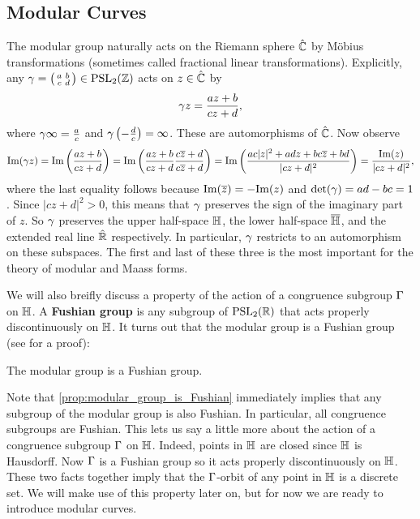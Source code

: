     \subsection*{Modular Curves}
      The modular group naturally acts on the Riemann sphere $\hat{\mathbb{C}}$ by M\"obius transformations (sometimes called fractional linear transformations). Explicitly, any $\gamma = \begin{psmallmatrix} a & b \\ c & d \end{psmallmatrix} \in \mathrm{PSL}_{2}(\mathbb{Z})$ acts on $z \in \hat{\mathbb{C}}$ by
      \[
        \gamma z = \frac{az+b}{cz+d},
      \]
      where $\gamma \infty = \frac{a}{c}$ and $\gamma\left(-\frac{d}{c}\right) = \infty$. These are automorphisms of $\hat{\mathbb{C}}$. Now observe
      \[
        \mathrm{Im}(\gamma z) = \mathrm{Im}\left(\frac{az+b}{cz+d}\right) = \mathrm{Im}\left(\frac{az+b}{cz+d}\frac{c\overline{z}+d}{c\overline{z}+d}\right) = \mathrm{Im}\left(\frac{ac|z|^{2}+adz+bc\overline{z}+bd}{|cz+d|^{2}}\right) = \frac{\mathrm{Im}(z)}{|cz+d|^{2}},
      \]
      where the last equality follows because $\mathrm{Im}(\overline{z}) = -\mathrm{Im}(z)$ and $\det(\gamma) = ad-bc = 1$. Since $|cz+d|^{2} > 0$, this means that $\gamma$ preserves the sign of the imaginary part of $z$. So $\gamma$ preserves the upper half-space $\mathbb{H}$, the lower half-space $\overline{\mathbb{H}}$, and the extended real line $\hat{\mathbb{R}}$ respectively. In particular, $\gamma$ restricts to an automorphism on these subspaces. The first and last of these three is the most important for the theory of modular and Maass forms.

      We will also breifly discuss a property of the action of a congruence subgroup $\Gamma$ on $\mathbb{H}$. A \textbf{Fushian group} is any subgroup of $\mathrm{PSL}_{2}(\mathbb{R})$ that acts properly discontinuously on $\mathbb{H}$. It turns out that the modular group is a Fushian group (see \cite{diamond2005first} for a proof):

      \begin{proposition}\label{prop:modular_group_is_Fushian}
        The modular group is a Fushian group.
      \end{proposition}

      Note that \cref{prop:modular_group_is_Fushian} immediately implies that any subgroup of the modular group is also Fushian. In particular, all congruence subgroups are Fushian. This lets us say a little more about the action of a congruence subgroup $\Gamma$ on $\mathbb{H}$. Indeed, points in $\mathbb{H}$ are closed since $\mathbb{H}$ is Hausdorff. Now $\Gamma$ is a Fushian group so it acts properly discontinuously on $\mathbb{H}$. These two facts together imply that the $\Gamma$-orbit of any point in $\mathbb{H}$ is a discrete set. We will make use of this property later on, but for now we are ready to introduce modular curves.

